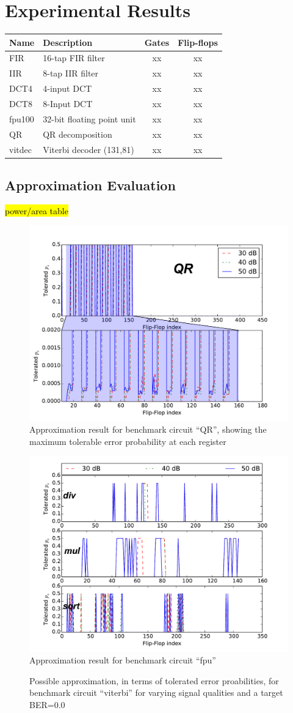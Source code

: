 \documentclass[conference]{IEEEtran}
\begin{document}
\section{Experimental Results}
\label{sec:experimental_results}

\begin{tabular} {| l | l | c | c |}
\hline
Name & Description & Gates & Flip-flops \\
\hline\hline
FIR & 16-tap FIR filter & xx & xx \\
IIR & 8-tap IIR filter & xx &xx \\
DCT4 & 4-input DCT & xx & xx \\
DCT8 & 8-Input DCT & xx & xx \\
fpu100 & 32-bit floating point unit & xx & xx \\
QR & QR decomposition & xx & xx \\
vitdec & Viterbi decoder (131,81) & xx & xx \\
\hline
\end{tabular}
\subsection{Approximation Evaluation}
\hl{power/area table}
\begin{figure}[tb]
  \centering
  \includegraphics[width=.5\textwidth]{figs/optimization_qr}
  \caption{Approximation result for benchmark circuit ``QR'', showing the maximum tolerable error probability at each register}
  \label{fig:optimization_qr}
\end{figure}
\begin{figure}[tb]
  \centering
  \includegraphics[width=.5\textwidth]{figs/optimization_fpu}
  \caption{Approximation result for benchmark circuit ``fpu''}
  \label{fig:optimization_fpu}
\end{figure}
\begin{figure}[tb]
  \centering
  \caption{Possible approximation, in terms of tolerated error proabilities, for benchmark circuit ``viterbi'' for varying signal qualities and a target BER=$0.0$}
  \label{fig:power_viterbi}
\end{figure}
\end{document}
